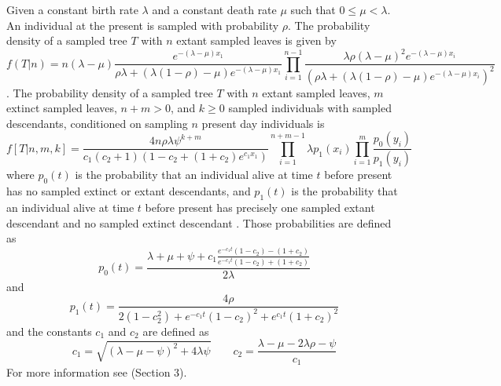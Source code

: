 \documentclass{llncs}
\begin{document}
Given a constant birth rate $\lambda$ and a constant death rate $\mu$ such that
$0 \leq \mu < \lambda$. An individual at the present is sampled with
probability $\rho$.  The probability density of a sampled tree $T$ with $n$
extant sampled leaves is given by
%
%
$$f(T|n) = n(\lambda-\mu)\frac{e^{-(\lambda-\mu)x_1}}{\rho\lambda + (\lambda(1 -\rho)-\mu)e^{-(\lambda-\mu)x_1}}\prod_{i=1}^{n-1}
\frac{\lambda\rho(\lambda-\mu)^2e^{-(\lambda-\mu)x_i}}{(\rho\lambda + (\lambda(1-\rho)-\mu)e^{-(\lambda-\mu)x_i})^2}$$
%
%
\citep[pg.~11][]{Stadler2010}.
The probability density of a sampled tree $T$ with $n$ extant sampled leaves,
$m$ extinct sampled leaves, $n+m > 0$, and $k \geq 0$ sampled individuals with
sampled descendants, conditioned on sampling $n$ present day individuals is
%
%
$$f[T|n,m,k] = \frac{4n\rho\lambda\psi^{k+m}}{c_1(c_2+1)(1-c_2+(1+c_2)e^{c_1x_1})}\prod_{i=1}^{n+m-1}\lambda p_1(x_i)\prod_{i=1}^{m}\frac{p_0(y_i)}{p_1(y_i)}$$
%
%
where $p_0(t)$ is the probability that an individual alive at time $t$ before
present has no sampled extinct or extant descendants, and $p_1(t)$ is the
probability that an individual alive at time $t$ before present has precisely
one sampled extant descendant and no sampled extinct descendant \citep[Eqn (9)][]{Stadler2010}. Those probabilities
are defined as
%
$$p_0(t) = \frac{\lambda+\mu+\psi+c_1\frac{e^{-c_1 t}(1-c_2)-(1+c_2)}{e^{-c_1t}(1-c_2)+(1+c_2)}}{2\lambda}$$
and
$$p_1(t) = \frac{4\rho}{2(1-c_2^2)+e^{-c_1t}(1-c_2)^2+e^{c_1t}(1+c_2)^2}$$
%
and the constants $c_1$ and $c_2$ are defined as
%
$$c_1 = \sqrt{(\lambda-\mu-\psi)^2 + 4\lambda\psi} \qquad c_2 = \frac{\lambda-\mu-2\lambda\rho-\psi}{c_1}$$
%
For more information see \cite{Stadler2010} (Section 3).
\end{document}
